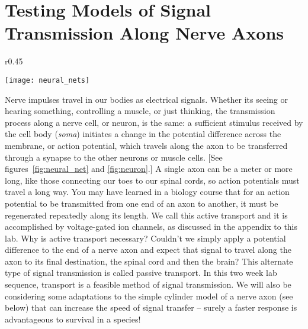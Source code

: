 \chapter{Testing Models of Signal Transmission Along Nerve Axons}
\thispagestyle{fancy}

\begin{wrapfigure}{r}{0.45\textwidth}
  \vspace{-25pt}  
  \begin{center}
  \texttt{[image: neural\_nets]}
  \end{center}
  \caption{Neurons form networks for information flow.}
  \label{fig:neural_net}
  \vspace{-5pt}
\end{wrapfigure}
Nerve impulses travel in our bodies as electrical signals. 
Whether its seeing or hearing something, controlling a muscle, or just thinking, the transmission process along a nerve cell, or neuron, is the same: a sufficient stimulus received by the cell body (\emph{soma}) initiates a change in the potential difference across the membrane, or action potential, which travels along the axon to be transferred through a synapse to the other neurons or muscle cells. 
[See figures~\ref{fig:neural_net} and \ref{fig:neuron}.]
A single axon can be a meter or more long, like those connecting our toes to our spinal cords, so action potentials must travel a long way.
You may have learned in a biology course that for an action potential to be transmitted from one end of an axon to another, it must be regenerated repeatedly along its length.
We call this active transport and it is accomplished by voltage-gated ion channels, as discussed in the appendix to this lab.
Why is active transport necessary?
Couldn't we simply apply a potential difference to the end of a nerve axon and expect that signal to travel along the axon to its final destination, the spinal cord and then the brain?
This alternate type of signal transmission is called passive transport. 
In this two week lab sequence, transport is a feasible method of signal transmission. 
We will also be considering some adaptations to the simple cylinder model of a nerve axon (see below) that can increase the speed of signal transfer – surely a faster response is advantageous to survival in a species!

